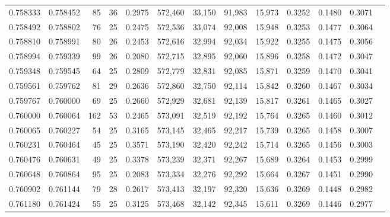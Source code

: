 \begin{tabular}{rrrrrrrrrrrrr}
0.758333 & 0.758452 &     85 &    36 &                                     0.2975 & 572,460 &  33,150 &  91,983 &  15,973 & 0.3252 & 0.1480 & 0.3071 \\
0.758492 & 0.758802 &     76 &    25 &                                     0.2475 & 572,536 &  33,074 &  92,008 &  15,948 & 0.3253 & 0.1477 & 0.3064 \\
0.758810 & 0.758991 &     80 &    26 &                                     0.2453 & 572,616 &  32,994 &  92,034 &  15,922 & 0.3255 & 0.1475 & 0.3056 \\
0.758994 & 0.759339 &     99 &    26 &                                     0.2080 & 572,715 &  32,895 &  92,060 &  15,896 & 0.3258 & 0.1472 & 0.3047 \\
0.759348 & 0.759545 &     64 &    25 &                                     0.2809 & 572,779 &  32,831 &  92,085 &  15,871 & 0.3259 & 0.1470 & 0.3041 \\
0.759561 & 0.759762 &     81 &    29 &                                     0.2636 & 572,860 &  32,750 &  92,114 &  15,842 & 0.3260 & 0.1467 & 0.3034 \\
0.759767 & 0.760000 &     69 &    25 &                                     0.2660 & 572,929 &  32,681 &  92,139 &  15,817 & 0.3261 & 0.1465 & 0.3027 \\
0.760000 & 0.760064 &    162 &    53 &                                     0.2465 & 573,091 &  32,519 &  92,192 &  15,764 & 0.3265 & 0.1460 & 0.3012 \\
0.760065 & 0.760227 &     54 &    25 &                                     0.3165 & 573,145 &  32,465 &  92,217 &  15,739 & 0.3265 & 0.1458 & 0.3007 \\
0.760231 & 0.760464 &     45 &    25 &                                     0.3571 & 573,190 &  32,420 &  92,242 &  15,714 & 0.3265 & 0.1456 & 0.3003 \\
0.760476 & 0.760631 &     49 &    25 &                                     0.3378 & 573,239 &  32,371 &  92,267 &  15,689 & 0.3264 & 0.1453 & 0.2999 \\
0.760648 & 0.760864 &     95 &    25 &                                     0.2083 & 573,334 &  32,276 &  92,292 &  15,664 & 0.3267 & 0.1451 & 0.2990 \\
0.760902 & 0.761144 &     79 &    28 &                                     0.2617 & 573,413 &  32,197 &  92,320 &  15,636 & 0.3269 & 0.1448 & 0.2982 \\
0.761180 & 0.761424 &     55 &    25 &                                     0.3125 & 573,468 &  32,142 &  92,345 &  15,611 & 0.3269 & 0.1446 & 0.2977 \\

\end{tabular}
